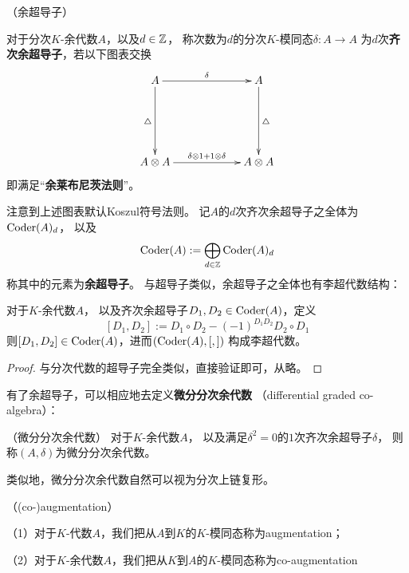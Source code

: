 \begin{definition}（余超导子）%

对于分次$K$-余代数$A$，以及$d\in\mathbb{Z}$，
称次数为$d$的分次$K$-模同态$\delta:A\to A$
为$d$次\textbf{齐次余超导子}，若以下图表交换
$$
  \xybigrow
  \xybigcol
  \xymatrix{
      A  \ar[r]^{\delta}  \ar[d]_{\yc}
    & A  \ar[d]^{\yc}
  \\
      A\ten A \ar[r]^-{\delta\ten 1+1\ten\delta}
    & A\ten A
  }
$$
即满足“\textbf{余莱布尼茨法则}”。
\end{definition}
注意到上述图表默认Koszul符号法则。
记$A$的$d$次齐次余超导子之全体为$\operatorname{Coder}(A)_d$，
以及
$$\operatorname{Coder}(A):=\bigoplus_{d\in\mathbb{Z}}\operatorname{Coder}(A)_d$$
称其中的元素为\textbf{余超导子}。
与超导子类似，余超导子之全体也有李超代数结构：

\begin{prop}对于$K$-余代数$A$，
以及齐次余超导子$D_1,D_2\in\operatorname{Coder}(A)$，定义
$$[D_1,D_2]:=D_1\circ D_2-(-1)^{D_1D_2}D_2\circ D_1$$
则$[D_1,D_2]\in\operatorname{Coder}(A)$，进而$(\operatorname{Coder}(A),[,])$
构成李超代数。
\end{prop}
\begin{proof}
与分次代数的超导子完全类似，直接验证即可，从略。
\end{proof}

有了余超导子，可以相应地去定义\textbf{微分分次余代数}
（differential graded co-algebra）：

\begin{definition}（微分分次余代数）
对于$K$-余代数$A$，
以及满足$\delta^2=0$的$1$次齐次余超导子$\delta$，
则称$(A,\delta)$为微分分次余代数。
\end{definition}

类似地，微分分次余代数自然可以视为分次上链复形。

\begin{rem}（(co-)augmentation）

（1）对于$K$-代数$A$，我们把从$A$到$K$的$K$-模同态称为augmentation；

（2）对于$K$-余代数$A$，我们把从$K$到$A$的$K$-模同态称为co-augmentation
\end{rem}

